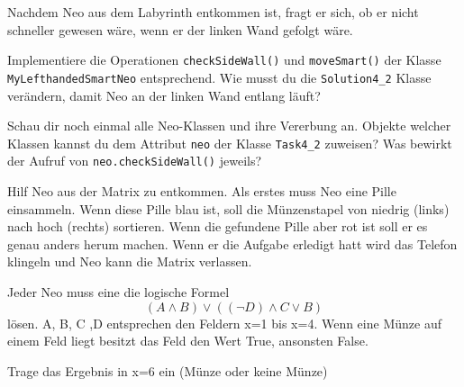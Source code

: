 
    Nachdem Neo aus dem Labyrinth entkommen ist, fragt er sich, ob er nicht schneller gewesen wäre, wenn er der linken Wand gefolgt wäre.

        \subexcercise Implementiere die Operationen \lstinline{checkSideWall()} und \lstinline{moveSmart()} der Klasse \lstinline{MyLefthandedSmartNeo} entsprechend.
        \subexcercise Wie musst du die \lstinline{Solution4_2} Klasse verändern, damit Neo an der linken Wand entlang läuft?

        \subexcercise Schau dir noch einmal alle Neo-Klassen und ihre Vererbung an.
        Objekte welcher Klassen kannst du dem Attribut \lstinline{neo} der Klasse \lstinline{Task4_2} zuweisen?
        Was bewirkt der Aufruf von \lstinline{neo.checkSideWall()} jeweils?


Hilf Neo aus der Matrix zu entkommen. Als erstes muss Neo eine Pille einsammeln. Wenn diese Pille blau ist, soll die Münzenstapel von niedrig (links) nach hoch (rechts) sortieren. Wenn die gefundene Pille aber rot ist soll er es genau anders herum machen.
Wenn er die Aufgabe erledigt hatt wird das Telefon klingeln und Neo kann die Matrix verlassen.

\titledquestion{}
Jeder Neo muss eine die logische Formel
$$
(A \land B) \lor ((\neg D) \land C \lor B)
$$
lösen.
A, B, C ,D entsprechen den Feldern x=1 bis x=4. Wenn eine Münze auf einem Feld liegt besitzt das Feld den Wert True, ansonsten False.

Trage das Ergebnis in x=6 ein (Münze oder keine Münze)
